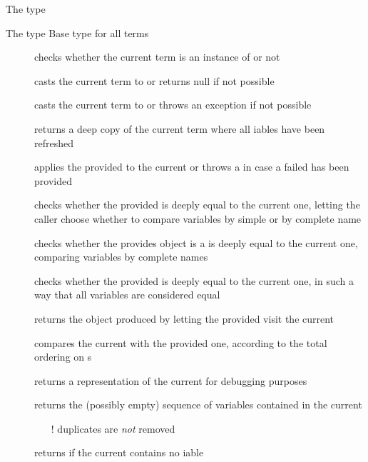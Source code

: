 \documentclass[handout]{beamer}
\begin{document}
\begin{frame}[allowframebreaks]{The  type}
    \begin{block}{The  type}\centering
        Base type for all terms
    \end{block}
    \begin{description}
        \item[] checks whether the current term is an instance of  or not
        \item[] casts the current term to  or returns null if not possible
        \item[] casts the current term to  or throws an exception if not possible
        \item[] returns a deep copy of the current term where all iables have been refreshed
        \item[] applies the provided  to the current  or throws a  in case a failed  has been provided
        \item[] checks whether the provided  is deeply equal to the current one, letting the caller choose whether to compare variables by simple or by complete name
        \item[] checks whether the provides object is a  is deeply equal to the current one, comparing variables by complete names
        \item[] checks whether the provided  is deeply equal to the current one, in such a way that all variables are considered equal
        \item[] returns the object produced by letting the provided  visit the current 
        \item[] compares the current  with the provided one, according to the total ordering on s
        \item[] returns a representation of the current  for debugging purposes
        \item[] returns the (possibly empty) sequence of variables contained in the current 
        \begin{itemize}\small
            \item[!] duplicates are \emph{not} removed
        \end{itemize}
        \item[] returns  if the current  contains no iable
    \end{description}

    \framebreak

\end{frame}
\end{document}
